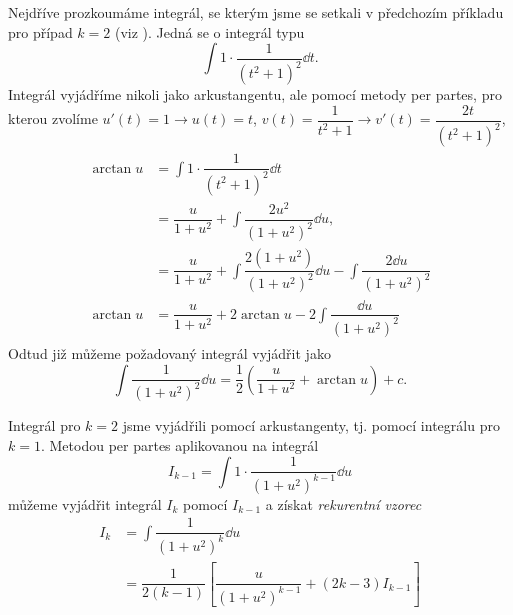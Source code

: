       Nejdříve prozkoumáme integrál, se kterým jsme se setkali v předchozím příkladu pro případ
      \(k = 2\) (viz \cite[p.~141]{Musilova2009MA1}). Jedná se o integrál typu 
      \begin{equation*}
        \int{1\cdot\dfrac{1}{(t^2 + 1)^{2}}\dd{t}}.
      \end{equation*}
      Integrál vyjádříme nikoli jako arkustangentu, ale pomocí metody per partes, pro kterou zvolíme
      \(u'(t)=1\rightarrow u(t)=t\), \(v(t) = \dfrac{1}{t^2+1}\rightarrow v'(t) =
      \dfrac{2t}{(t^2+1)^2}\),
      \begin{gather*} 
        \begin{align*}
          \arctan u &=  \int{1\cdot\dfrac{1}{(t^2 + 1)^{2}}\dd{t}}              \\
                    &=  \dfrac{u}{1+u^2} + \int\dfrac{2u^2}{(1+u^2)^2}\dd{u},   \\
                    &=  \dfrac{u}{1+u^2} + \int\dfrac{2(1+u^2)}{(1+u^2)^2}\dd{u}
                                        - \int\dfrac{2\dd{u}}{(1+u^2)^2}      \\
          \arctan u &=  \dfrac{u}{1+u^2} + 2\arctan u - 2\int\dfrac{\dd{u}}{(1+u^2)^2}  
        \end{align*}
      \end{gather*}  
      Odtud již můžeme požadovaný integrál vyjádřit jako
      \begin{equation*}
        \int\dfrac{1}{(1+u^2)^2}\dd{u} = \dfrac{1}{2}\left(\dfrac{u}{1+u^2} + \arctan u\right) + c. 
      \end{equation*}

      Integrál pro \(k=2\) jsme vyjádřili pomocí arkustangenty, tj. pomocí integrálu pro \(k=1\).
      Metodou per partes aplikovanou na integrál
      \begin{equation*}
        I_{k-1} = \int1\cdot\dfrac{1}{(1+u^2)^{k-1}}\dd{u}
      \end{equation*}
      můžeme vyjádřit integrál \(I_k\) pomocí \(I_{k-1}\) a získat \emph{rekurentní vzorec}
      \begin{align}
        I_k &= \int\dfrac{1}{(1+u^2)^k}\dd{u}                                   \label{mai:eq165} \\
            &= \dfrac{1}{2(k-1)}\left[\dfrac{u}{(1+u^2)^{k-1}}+(2k-3)I_{k-1}\right]  \nonumber
      \end{align}

